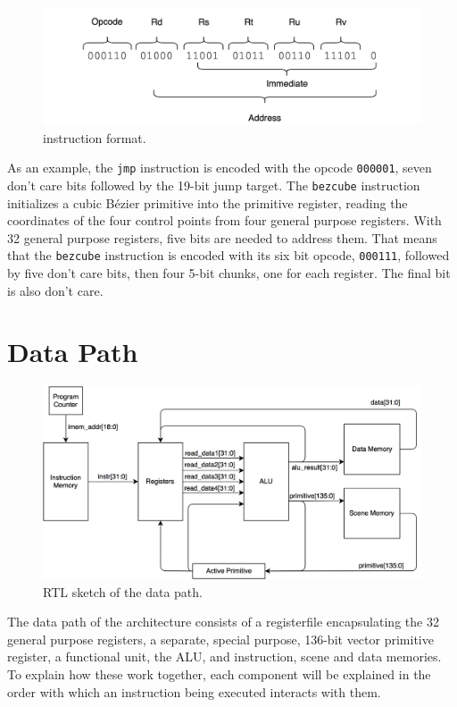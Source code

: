 \begin{figure}[h!]
    \includegraphics[width=\linewidth]{images/instruction-format.png}
    \caption{\vthreek instruction format.}
    \label{fig:instruction-format}
\end{figure}

As an example, the \texttt{jmp} instruction is encoded with the opcode \texttt{000001}, seven don't care bits followed by the 19-bit jump target.
The \texttt{bezcube} instruction initializes a cubic Bézier primitive into the primitive register, reading the coordinates of the four control points from four general purpose registers.
With 32 general purpose registers, five bits are needed to address them.
That means that the \texttt{bezcube} instruction is encoded with its six bit opcode, \texttt{000111}, followed by five don't care bits, then four 5-bit chunks, one for each register.
The final bit is also don't care.

\section{Data Path}

\begin{figure}[h!]
    \includegraphics[width=\linewidth]{images/Data_path.png}
    \caption{RTL sketch of the data path.}
    \label{fig:datapath}
\end{figure}

The data path of the \vthreek architecture consists of a registerfile encapsulating the 32 general purpose registers, a separate, special purpose, 136-bit vector primitive register, a functional unit, the ALU, and instruction, scene and data memories.
To explain how these work together, each component will be explained in the order with which an instruction being executed interacts with them.

